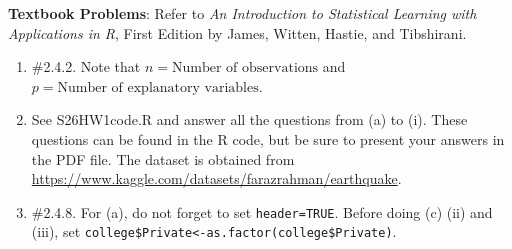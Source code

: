 \documentclass[12pt]{article}
\begin{document}
\textbf{Textbook Problems}: Refer to \textit{An Introduction to Statistical Learning with Applications in R}, First Edition by James, Witten, Hastie, and Tibshirani.\\

\begin{enumerate}
\item  \#2.4.2. Note that $n = \mbox{Number of observations}$ and $p = \mbox{Number of explanatory variables}$.\\

\item See S26HW1code.R and answer all the questions from (a) to (i). These questions can be found in the R code, but be sure to present your answers in the PDF file. The dataset is obtained from\\
\scriptsize
\url{https://www.kaggle.com/datasets/farazrahman/earthquake}.\\

\normalsize
\item  \#2.4.8. For (a), do not forget to set {\tt header=TRUE}. Before doing (c) (ii) and (iii), set {\tt college\$Private<-as.factor(college\$Private)}. \\
\end{enumerate}
\end{document}
